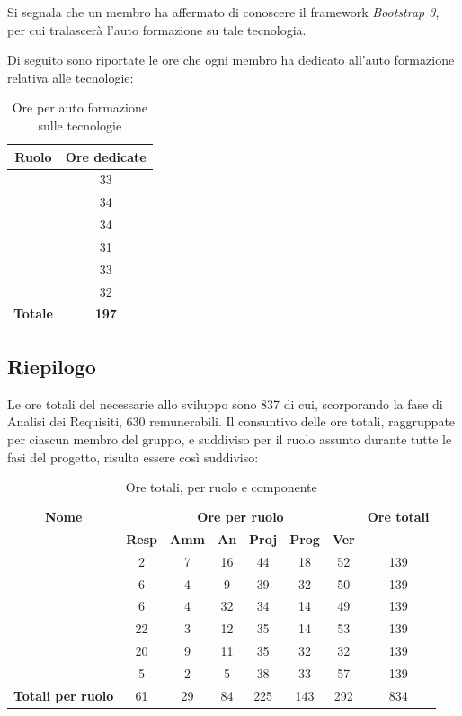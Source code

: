 Si segnala che un membro ha affermato di conoscere il framework \textit{Bootstrap 3}, per cui tralascerà l'auto formazione su tale tecnologia.

Di seguito sono riportate le ore che ogni membro ha dedicato all'auto formazione relativa alle tecnologie:

\begin{table}[H]
	\begin{center}
		\begin{tabular}{|c|c|}
			\hline
			\textbf{Ruolo}	& \textbf{Ore dedicate}  \\
			\hline
			\MC	&	33		\\
			\hline
			\DAN	&	34	\\
			\hline
			\AN	&	34		\\
			\hline
			\AS	&	31		\\
			\hline
			\NS	&	33		\\
			\hline
			\DS	&	32		\\
			\hline
			\textbf{Totale} & \textbf{197}  \\
			\hline
		\end{tabular}
	\end{center}
	\caption{Ore per auto formazione sulle tecnologie}
\end{table}

\newpage
\subsection{Riepilogo}
Le ore totali del necessarie allo sviluppo sono 837 di cui, scorporando la fase di Analisi dei Requisiti, 630 remunerabili. Il consuntivo delle ore totali, raggruppate per ciascun membro del gruppo, e suddiviso per il ruolo assunto durante tutte le fasi del progetto, risulta essere così suddiviso:

\begin{table}[H]
	\begin{center}
		\begin{tabular}{|c|c|c|c|c|c|c|c|}
			\hline
			\textbf{Nome} & \multicolumn{6}{c|}{\textbf{Ore per ruolo}} & \textbf{Ore totali} \\\cline{2-7}
			& \textbf{Resp} & \textbf{Amm} & \textbf{An} & \textbf{Proj} & \textbf{Prog} & \textbf{Ver} & \\
			\hline
			\MC			&	2	&	7	&	16	&	44	&	18	&	52	&	139	\\
			\hline
			\AN			&	6	&	4	&	9	&	39	&	32	&	50	& 	139	\\
			\hline
			\DAN		&	6	&	4	&	32	&	34	&	14	&	49	&	139	\\
			\hline
			\AS			&	22	&	3 	&	12 	&	35	&	14 	& 	53	&	139	\\
			\hline
			\NS 		&	20	&	9	&	11	&	35	&	32	& 	32	&	139	\\
			\hline
			\DS			& 	5	&	2	&	5	&	38	&	33	&	57	&	139	\\
			\hline
			\textbf{Totali per ruolo}	& 	61	&	29	&	84	&  225	&	143	&	292	&	834	\\
			\hline
		\end{tabular}
	\end{center}
	\caption{Ore totali, per ruolo e componente}
\end{table}

